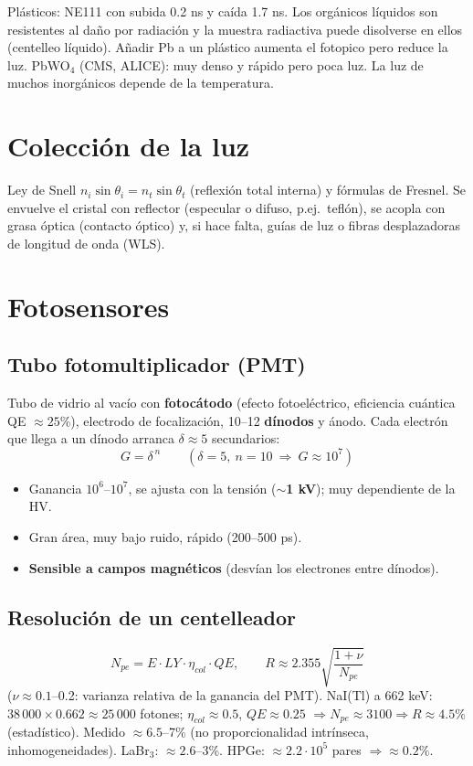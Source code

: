 \begin{dato}
Plásticos: NE111 con subida 0.2 ns y caída 1.7 ns. Los orgánicos líquidos son resistentes al daño por radiación y la muestra
radiactiva puede disolverse en ellos (centelleo líquido). Añadir Pb a un plástico aumenta el fotopico pero reduce la luz.
PbWO$_4$ (CMS, ALICE): muy denso y rápido pero poca luz. La luz de muchos inorgánicos depende de la temperatura.
\end{dato}

\section{Colección de la luz}
Ley de Snell $n_i\sin\theta_i=n_t\sin\theta_t$ (reflexión total interna) y fórmulas de Fresnel. Se envuelve el cristal con
reflector (especular o difuso, p.ej.\ teflón), se acopla con grasa óptica (contacto óptico) y, si hace falta, guías de luz o
fibras desplazadoras de longitud de onda (WLS).

\section{Fotosensores}
\subsection{Tubo fotomultiplicador (PMT)}
\begin{clave}[PMT]
Tubo de vidrio al vacío con \textbf{fotocátodo} (efecto fotoeléctrico, eficiencia cuántica QE $\approx25\%$), electrodo de
focalización, 10--12 \textbf{dínodos} y ánodo. Cada electrón que llega a un dínodo arranca $\delta\approx5$ secundarios:
\[ G=\delta^{\,n}\qquad(\delta=5,\ n=10\ \Rightarrow\ G\approx10^7) \]
\begin{itemize}
\item Ganancia $10^6$--$10^7$, se ajusta con la tensión (\textbf{$\sim$1 kV}); muy dependiente de la HV.
\item Gran área, muy bajo ruido, rápido (200--500 ps).
\item \textbf{Sensible a campos magnéticos} (desvían los electrones entre dínodos).
\end{itemize}
\end{clave}

\subsection{Resolución de un centelleador}
\begin{clave}
\[
N_{pe}=E\cdot LY\cdot\eta_{col}\cdot QE,\qquad R\approx2.355\sqrt{\frac{1+\nu}{N_{pe}}}
\]
($\nu\approx0.1$--0.2: varianza relativa de la ganancia del PMT).
NaI(Tl) a 662 keV: $38\,000\times0.662\approx25\,000$ fotones; $\eta_{col}\approx0.5$, $QE\approx0.25$
$\Rightarrow N_{pe}\approx3100\Rightarrow R\approx4.5\%$ (estadístico). Medido $\approx6.5$--7\% (no proporcionalidad intrínseca,
inhomogeneidades). LaBr$_3$: $\approx2.6$--3\%. HPGe: $\approx2.2\cdot10^5$ pares $\Rightarrow\approx0.2\%$.
\end{clave}

